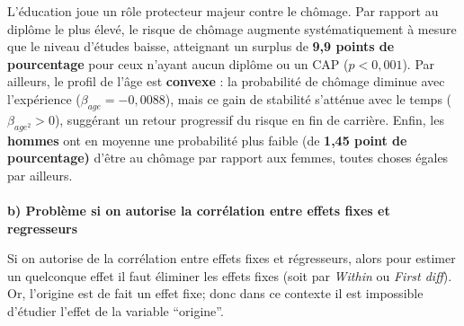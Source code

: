 \documentclass[
  letterpaper,
  DIV=11,
  numbers=noendperiod]{scrartcl}
\makeatletter
\let\oldparagraph\paragraph
\renewcommand{\paragraph}{
    \@ifstar
      \xxxParagraphStar
      \xxxParagraphNoStar
  }
\newcommand{\xxxParagraphStar}[1]{\oldparagraph*{#1}\mbox{}}
\newcommand{\xxxParagraphNoStar}[1]{\oldparagraph{#1}\mbox{}}
\makeatother
\begin{document}
L'éducation joue un rôle protecteur majeur contre le chômage. Par
rapport au diplôme le plus élevé, le risque de chômage augmente
systématiquement à mesure que le niveau d'études baisse, atteignant un
surplus de \textbf{9,9 points de pourcentage} pour ceux n'ayant aucun
diplôme ou un CAP (\(p < 0,001\)). Par ailleurs, le profil de l'âge est
\textbf{convexe} : la probabilité de chômage diminue avec l'expérience
(\(\beta_{age} = -0,0088\)), mais ce gain de stabilité s'atténue avec le
temps (\(\beta_{age^2} > 0\)), suggérant un retour progressif du risque
en fin de carrière. Enfin, les \textbf{hommes} ont en moyenne une
probabilité plus faible (de \textbf{1,45 point de pourcentage)} d'être
au chômage par rapport aux femmes, toutes choses égales par ailleurs.

\paragraph{\texorpdfstring{\textbf{b) Problème si on autorise la
corrélation entre effets fixes et
regresseurs}}{b) Problème si on autorise la corrélation entre effets fixes et regresseurs}}\label{b-probluxe8me-si-on-autorise-la-corruxe9lation-entre-effets-fixes-et-regresseurs}

Si on autorise de la corrélation entre effets fixes et régresseurs,
alors pour estimer un quelconque effet il faut éliminer les effets fixes
(soit par \emph{Within} ou \emph{First diff}). Or, l'origine est de fait
un effet fixe; donc dans ce contexte il est impossible d'étudier l'effet
de la variable ``origine''.
\end{document}
